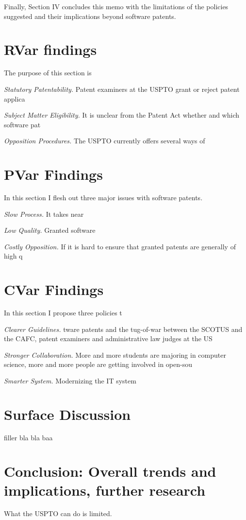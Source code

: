 \documentclass[12pt]{texmemo} %
\begin{document}
Finally, Section IV concludes this memo with the limitations of the policies suggested and their implications beyond software patents.

\section{RVar findings}

The purpose of this section is 

\textit{Statutory Patentability.} Patent examiners at the USPTO grant or reject patent applica

\textit{Subject Matter Eligibility.} It is unclear from the Patent Act whether and which software pat


\textit{Opposition Procedures.} The USPTO currently offers several ways of 
\section{PVar Findings}

In this section I flesh out three major issues with software patents.

\textit{Slow Process.} It takes near

\textit{Low Quality.} Granted software

\textit{Costly Opposition.} If it is hard to ensure that granted patents are generally of high q

\section{CVar Findings}

In this section I propose three policies t

\textit{Clearer Guidelines.} tware patents and the tug-of-war between the SCOTUS and the CAFC, patent examiners and administrative law judges at the US

\textit{Stronger Collaboration.} \cite{lee} More and more students are majoring in computer science, more and more people are getting involved in open-sou 

\textit{Smarter System.} Modernizing the IT system 

\section{Surface Discussion}
filler bla bla baa

\section{Conclusion: Overall trends and implications, further research}

What the USPTO can do is limited. 

\newpage
\printbibliography
\end{document}
